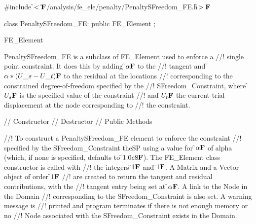 
\indent \#include \f$<\tilde{ }{\bf F}$/analysis/fe\_ele/penalty/PenaltySFreedom\_FE.h\f$>{\bf F}$

\indent class PenaltySFreedom\_FE: public FE\_Element ;

\indent FE\_Element
\indent{} 

\indent PenaltySFreedom\_FE is a subclass of FE\_Element used to enforce a
//! single point constraint. It does this by adding \f$\alpha{\bf F}$ to the
//! tangent and \f$\alpha * (U\_s - U\_t){\bf F}$ to the residual at the locations
//! corresponding to the constrained degree-of-freedom specified by the
//! SFreedom\_Constraint, where \f$U_s{\bf F}$ is the specified value of the constraint
//! and \f$U_t{\bf F}$ the current trial displacement at the node corresponding to
//! the constraint.


\indent\indent // Constructor
\indent{}
\indent\indent // Destructor
\indent{}
\indent\indent // Public Methods
\indent{} 
\indent{}  
\indent{} 
\indent{}

//! To construct a PenaltySFreedom\_FE element to enforce the constraint
//! specified by the SFreedom\_Constraint \p theSP using a value for
\f$\alpha{\bf F}$ of \p alpha (which, if none is specified, defaults to
\f$1.0e8{\bf F}$). The FE\_Element class constructor is called with 
//! the integers \f$1{\bf F}$ and \f$1{\bf F}$. A Matrix and a Vector object of order \f$1{\bf F}$
//! are created to return the tangent and residual contributions, with the
//! tangent entry being set at \f$\alpha{\bf F}$. A link to the Node in the  Domain
//! corresponding to the SFreedom\_Constraint is also set. A warning message is
//! printed and program terminates if there is not enough memory or no
//! Node associated with the SFreedom\_Constraint exists in the Domain.


